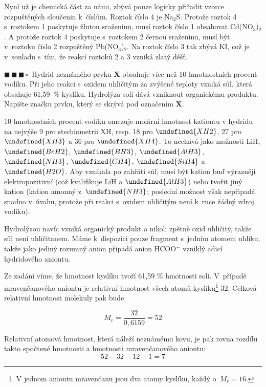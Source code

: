 \documentclass{book}
\let\ch\undefined
\newcommand{\tri}{$\blacksquare \, \blacksquare \, \blacksquare \, \square \; \; $}
\renewenvironment{quotation}{\par}{\par} %
\begin{document}
Nyní už je chemická část za námi, zbývá pouze logicky přiřadit vzorce
rozpuštěných sloučenin k~číslům. Roztok číslo 4 je Na$_{2}$S. Protože
roztok 4 s~roztokem 1 poskytuje žlutou sraženinu, musí roztok číslo
1 obsahovat Cd(NO$_{3}$)$_{2}$. A protože roztok 4 poskytuje s~roztokem
2 černou sraženinu, musí být v~roztoku číslo 2 rozpuštěný Pb(NO$_{3}$)$_{2}$.
Na roztok číslo 3 tak zbývá KI, což je v~souladu s~tím, že reakcí
roztoků 2 a 3 vzniká zlatý déšť. 

\hrulefill %
\begin{quotation}
\tri Hydrid neznámého prvku \textbf{X} obsahuje více než 10 hmotnostních procent
vodíku. Při jeho reakci s~oxidem uhličitým za zvýšené teploty vzniká
sůl, která obsahuje 61,59~\% kyslíku. Hydrolýza soli dává vzniknout
organickému produktu. Napište značku prvku, který se skrývá pod označením
\textbf{X}.
\end{quotation} \dotfill \par 
10 hmotnostních procent vodíku omezuje molární hmotnost kationtu v
hydridu na nejvýše 9 pro stechiometrii XH, resp. 18 pro $\ch{XH2}$,
27 pro $\ch{XH3}$ a 36 pro $\ch{XH4}$. To nechává jako možnosti
LiH, $\ch{BeH2}$, $\ch{BH3}$, $\ch{AlH3}$, $\ch{NH3}$, $\ch{CH4}$,
$\ch{SiH4}$ a $\ch{H2O}$. Aby vznikala po zahřátí sůl, musí být
kation buď výrazněji elektropozitivní (což kvalifikuje LiH a $\ch{AlH3}$)
nebo tvořit jiný kation (kation amonný z~$\ch{NH3}$; poslední možnost
však nepřipadá snadno v~úvahu, protože při reakci s~oxidem uhličitým
není k~ruce žádný zdroj vodíku).

Hydrolýzou navíc vzniká organický produkt a nikoli zpětně oxid uhličitý,
takže sůl není uhličitanem. Máme k~dispozici pouze fragment s~jedním
atomem uhlíku, takže jako jediný rozumný anion připadá anion HCOO$^{-}$
vzniklý adicí hydridového aniontu. 

Ze zadání víme, že hmotnost kyslíku tvoří 61,59 \% hmotnosti soli. V~případě mravenčanového aniontu je relativní hmotnost všech atomů kyslíku\footnote{V jednom aniontu mravenčanu jsou dva atomy kyslíku, každý o~$M_r = 16$.} 32. Celková relativní hmotnost molekuly pak bude

\[
M_r = \frac{32}{0,6159} = 52
\]

Relativní atomová hmotnost, která náleží neznámému kovu, je pak rovna rozdílu takto spočtené hmotnosti a hmotnosti mravenčanového aniontu:
\[
52-32-12-1=7
\]
\end{document}
